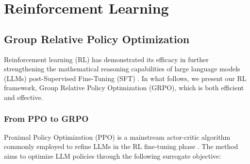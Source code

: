 \section{Reinforcement Learning}

\subsection{Group Relative Policy Optimization} Reinforcement learning (RL) has demonstrated its efficacy in further strengthening the mathematical reasoning capabilities of large language models (LLMs) post-Supervised Fine-Tuning (SFT) \citep{wang2023math,wizardmath}. In what follows, we present our RL framework, Group Relative Policy Optimization (GRPO), which is both efficient and effective.

\subsubsection{From PPO to GRPO} Proximal Policy Optimization (PPO) \citep{schulman2017proximal} is a mainstream actor-critic algorithm commonly employed to refine LLMs in the RL fine-tuning phase \citep{ouyang2022training}. The method aims to optimize LLM policies through the following surrogate objective:

